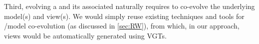 Third, evolving a \metamodel and its associated \viewtypes naturally requires to
co-evolve the underlying model(s) and view(s). We would simply reuse existing 
techniques and tools for \metamodel/model co-evolution (as discussed in \cref{sec:RW}),
from which, in our approach, views would be automatically generated using VGTs.

